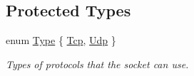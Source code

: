 \subsection*{Protected Types}
\begin{DoxyCompactItemize}
\item 
enum \hyperlink{classsf_1_1_socket_a5d3ff44e56e68f02816bb0fabc34adf8}{Type} \{ \hyperlink{classsf_1_1_socket_a5d3ff44e56e68f02816bb0fabc34adf8acc02e97e90234b957eaad4dff7f22214}{Tcp}, 
\hyperlink{classsf_1_1_socket_a5d3ff44e56e68f02816bb0fabc34adf8a6ebf3094830db4820191a327f3cc6ce2}{Udp}
 \}
\begin{DoxyCompactList}\small\item\em Types of protocols that the socket can use. \end{DoxyCompactList}\end{DoxyCompactItemize}
